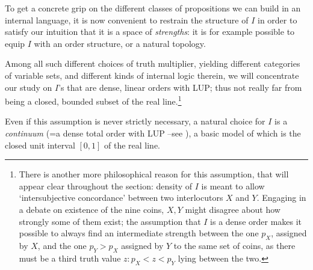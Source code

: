 \begin{remark}\label{something_on_I}
  To get a concrete grip on the different classes of propositions we  can build in an internal language, it is now convenient to restrain the structure of $I$ in order to satisfy our intuition that it is a space of \emph{strengths}: it is for example possible to equip $I$ with an order structure, or a natural topology. 
  
  Among all such different choices of truth multiplier, yielding different categories of variable sets, and different kinds of internal logic therein, we will concentrate our study on $I$'s that are dense, linear orders with LUP; thus not really far from being a closed, bounded subset of the real line.\footnote{There is another more philosophical reason for this assumption, that will appear clear throughout the section: density of $I$ is meant to allow `intersubjective concordance' between two interlocutors $X$ and $Y$. Engaging in a debate on existence of the nine coins, $X,Y$ might disagree about how strongly some of them exist; the assumption that $I$ is a dense order makes it possible to always find an intermediate strength between the one $p_X$, assigned by $X$, and the one $p_Y > p_X$ assigned by $Y$ to the same set of coins, as there must be a third truth value $z:p_X < z < p_Y$ lying between the two.}
\end{remark}
Even if this assumption is never strictly necessary, a natural choice for $I$ is a \emph{continuum} (=a dense total order with LUP --see \cite{moschovakis2009descriptive}), a basic model of which is the closed unit interval $[0,1]$ of the real line. 

